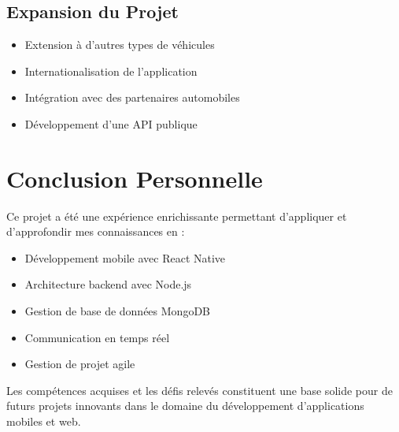 \subsection{Expansion du Projet}
\begin{itemize}
    \item Extension à d'autres types de véhicules
    \item Internationalisation de l'application
    \item Intégration avec des partenaires automobiles
    \item Développement d'une API publique
\end{itemize}

\section{Conclusion Personnelle}
Ce projet a été une expérience enrichissante permettant d'appliquer et d'approfondir mes connaissances en :
\begin{itemize}
    \item Développement mobile avec React Native
    \item Architecture backend avec Node.js
    \item Gestion de base de données MongoDB
    \item Communication en temps réel
    \item Gestion de projet agile
\end{itemize}

Les compétences acquises et les défis relevés constituent une base solide pour de futurs projets innovants dans le domaine du développement d'applications mobiles et web. 